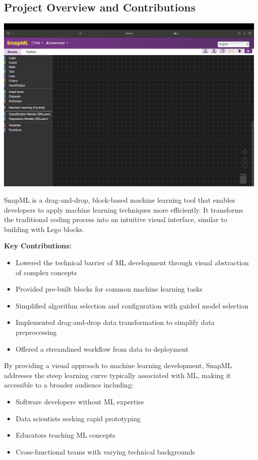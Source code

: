 \documentclass[a0paper,portrait]{article}
\newcommand{\compresslist}{%
\setlength{\itemsep}{0pt}%
\setlength{\parskip}{0pt}%
\setlength{\parsep}{0pt}%
}
\begin{document}
\begin{multicols}{2}

\section{Project Overview and Contributions}

\begin{center}
\includegraphics[width=0.9\linewidth]{程序界面.png}
\end{center}

SnapML is a drag-and-drop, block-based machine learning tool that enables developers to apply machine learning techniques more efficiently. It transforms the traditional coding process into an intuitive visual interface, similar to building with Lego blocks.

\textbf{\color{headercol}Key Contributions:}
\begin{itemize}\compresslist
    \item Lowered the technical barrier of ML development through visual abstraction of complex concepts
    \item Provided pre-built blocks for common machine learning tasks
    \item Simplified algorithm selection and configuration with guided model selection
    \item Implemented drag-and-drop data transformation to simplify data preprocessing
    \item Offered a streamlined workflow from data to deployment
\end{itemize}

By providing a visual approach to machine learning development, SnapML addresses the steep learning curve typically associated with ML, making it accessible to a broader audience including:
\begin{itemize}\compresslist
    \item Software developers without ML expertise
    \item Data scientists seeking rapid prototyping
    \item Educators teaching ML concepts
    \item Cross-functional teams with varying technical backgrounds
\end{itemize}


\end{multicols}
\end{document}
